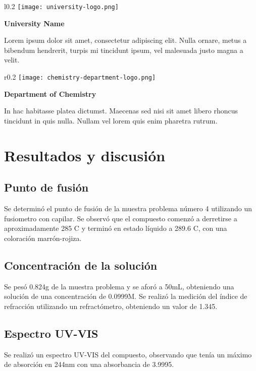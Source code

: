 \documentclass{article}
\begin{document}
\begin{wrapfigure}{l}{0.2\textwidth}
    \texttt{[image: university-logo.png]}
\end{wrapfigure}
\textbf{University Name}

Lorem ipsum dolor sit amet, consectetur adipiscing elit. Nulla ornare, metus a bibendum hendrerit, turpis mi tincidunt ipsum, vel malesuada justo magna a velit.

\begin{wrapfigure}{r}{0.2\textwidth}
    \texttt{[image: chemistry-department-logo.png]}
\end{wrapfigure}
\textbf{Department of Chemistry}

In hac habitasse platea dictumst. Maecenas sed nisi sit amet libero rhoncus tincidunt in quis nulla. Nullam vel lorem quis enim pharetra rutrum. 

\section{Resultados y discusión}

\subsection{Punto de fusión}

Se determinó el punto de fusión de la muestra problema número 4 utilizando un fusiometro con capilar. Se observó que el compuesto comenzó a derretirse a aproximadamente 285 \degree C y terminó en estado líquido a 289.6 \degree C, con una coloración marrón-rojiza.

\subsection{Concentración de la solución}

Se pesó 0.824g de la muestra problema y se aforó a 50mL, obteniendo una solución de una concentración de 0.0999M. Se realizó la medición del índice de refracción utilizando un refractómetro, obteniendo un valor de 1.345.

\subsection{Espectro UV-VIS}

Se realizó un espectro UV-VIS del compuesto, observando que tenía un máximo de absorción en 244nm con una absorbancia de 3.9995.
\end{document}
